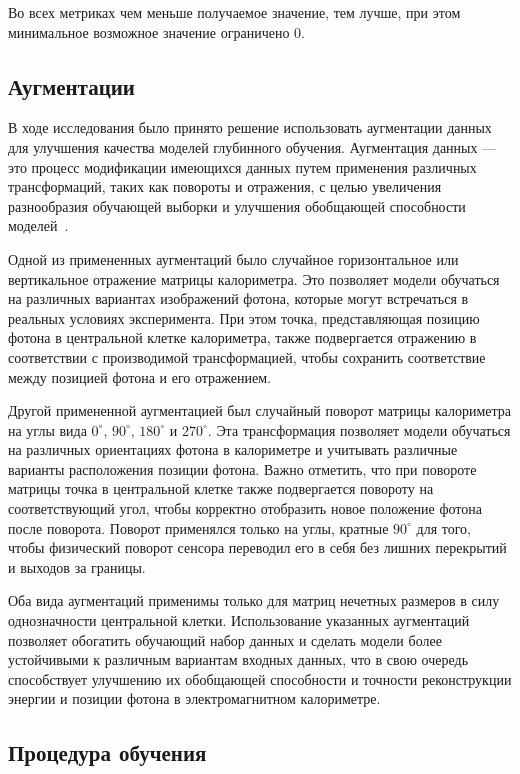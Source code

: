 \documentclass[a4paper,12pt]{extarticle}
\begin{document}
Во всех метриках чем меньше получаемое значение, тем лучше, при этом минимальное возможное значение ограничено $0$.

\subsection{Аугментации}
\label{subsection:augmentations}

В ходе исследования было принято решение использовать аугментации данных для улучшения качества моделей глубинного обучения. Аугментация данных --- это процесс модификации имеющихся данных путем применения различных трансформаций, таких как повороты и отражения, с целью увеличения разнообразия обучающей выборки и улучшения обобщающей способности моделей~\cite{perez2017effectiveness}.

Одной из примененных аугментаций было случайное горизонтальное или вертикальное отражение матрицы калориметра. Это позволяет модели обучаться на различных вариантах изображений фотона, которые могут встречаться в реальных условиях эксперимента. При этом точка, представляющая позицию фотона в центральной клетке калориметра, также подвергается отражению в соответствии с производимой трансформацией, чтобы сохранить соответствие между позицией фотона и его отражением.

Другой примененной аугментацией был случайный поворот матрицы калориметра на углы вида $0^{\circ}$, $90^{\circ}$, $180^{\circ}$ и $270^{\circ}$. Эта трансформация позволяет модели обучаться на различных ориентациях фотона в калориметре и учитывать различные варианты расположения позиции фотона. Важно отметить, что при повороте матрицы точка в центральной клетке также подвергается повороту на соответствующий угол, чтобы корректно отобразить новое положение фотона после поворота. Поворот применялся только на углы, кратные $90^{\circ}$ для того, чтобы физический поворот сенсора переводил его в себя без лишних перекрытий и выходов за границы.

Оба вида аугментаций применимы только для матриц нечетных размеров в силу однозначности центральной клетки. Использование указанных аугментаций позволяет обогатить обучающий набор данных и сделать модели более устойчивыми к различным вариантам входных данных, что в свою очередь способствует улучшению их обобщающей способности и точности реконструкции энергии и позиции фотона в электромагнитном калориметре.

\subsection{Процедура обучения}
\end{document}
